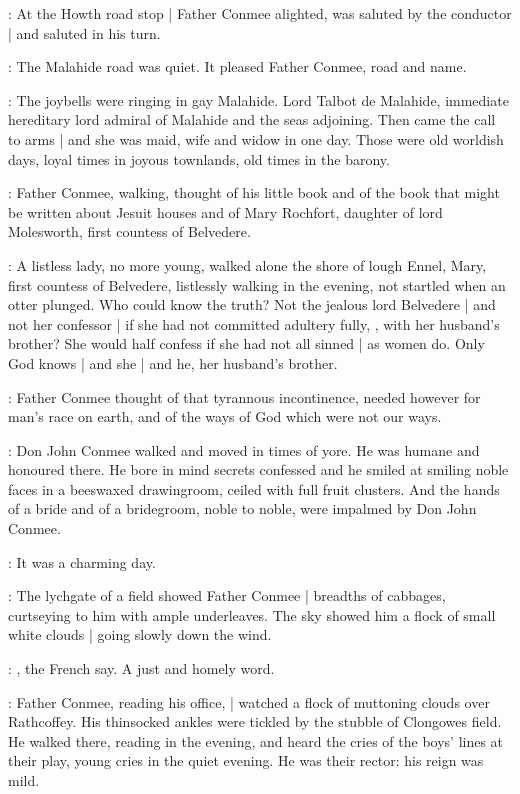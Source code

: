 :
At the Howth road stop |
Father Conmee alighted,
was saluted by the conductor |
and saluted in his turn.

:
The Malahide road was quiet.
It pleased Father Conmee, road and name.

\conmeeint:
The joybells were ringing in gay Malahide.
Lord Talbot de Malahide,
immediate hereditary lord admiral of Malahide and the seas adjoining.
Then came the call to arms |
and she was maid, wife and widow in one day.
Those were old worldish days,
loyal times in joyous townlands,
old times in the barony.%

:
Father Conmee, walking, thought of his little book
and of the book that might be written about Jesuit houses
and of Mary Rochfort,
daughter of lord Molesworth,
first countess of Belvedere.

\conmeeint:
A listless lady, no more young,
walked alone the shore of lough Ennel,
Mary, first countess of Belvedere,
listlessly walking in the evening,
not startled when an otter plunged.
Who could know the truth?
Not the jealous lord Belvedere |
and not her confessor |
if she had not committed adultery fully,
,
with her husband's brother?
She would half confess if she had not all sinned |
as women do.
Only God knows |
and she |
and he, her husband's brother.

:
Father Conmee thought of that tyrannous incontinence,
needed however for man's race on earth,
and of the ways of God which were not our ways.

:
Don John Conmee walked and moved in times of yore.
He was humane and honoured there.
He bore in mind secrets confessed
and he smiled at smiling noble faces in a beeswaxed drawingroom,
ceiled with full fruit clusters.
And the hands of a bride and of a bridegroom,
noble to noble,
were impalmed by Don John Conmee.

:
It was a charming day.

:
The lychgate of a field showed Father Conmee |
breadths of cabbages,
curtseying to him with ample underleaves.
The sky showed him a flock of small white clouds |
going slowly down the wind.

\conmeeint:
, the French say.
A just and homely word.

:
Father Conmee, reading his office, |
watched a flock of muttoning clouds over Rathcoffey.
His thinsocked ankles were tickled by the stubble of Clongowes field.
He walked there, reading in the evening,
and heard the cries of the boys' lines at their play,
young cries in the quiet evening.
He was their rector: his reign was mild.

